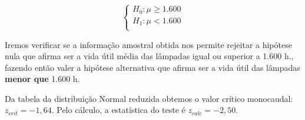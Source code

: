 \documentclass[
]{book}
\begin{document}
\[
\begin{cases}
    H_{0}: \mu \ge 1.600 \\
    H_{1}: \mu < 1.600  \\
\end{cases}  
\]

\hfill\break

Iremos verificar se a informação amostral obtida nos permite rejeitar a hipótese nula que afirma ser a vida útil média das lâmpadas igual ou superior a 1.600 h., fazendo então valer a hipótese alternativa que afirma ser a vida útil das lâmpadas \textbf{menor que} 1.600 h.

\hfill\break

Da tabela da distribuição Normal reduzida obtemos o valor crítico monocaudal: \({z}_{crit}=-1,64\). Pelo cálculo, a estatística do teste é \(z_{calc}=-2,50\).

\hfill\break
\end{document}
